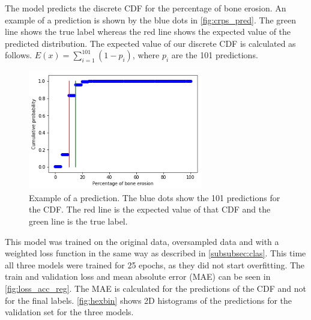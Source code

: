 \documentclass[12pt]{article}
\begin{document}
The model predicts the discrete CDF for the percentage of bone erosion. An example of a prediction is shown by the blue dots in \autoref{fig:crps_pred}. The green line shows the true label whereas the red line shows the expected value of the predicted distribution. The expected value of our discrete CDF is calculated as follows. $E(x) = \sum_{i=1}^{101} \left ( 1 - p_i \right )$, where $p_i$ are the 101 predictions.

\begin{figure}[ht]
\includegraphics[width=3in]{crps_pred}	
\caption{Example of a prediction. The blue dots show the 101 predictions for the CDF. The red line is the expected value of that CDF and the green line is the true label.}
\label{fig:crps_pred}
\end{figure}

This model was trained on the original data, oversampled data and with a weighted loss function in the same way as described in \autoref{subsubsec:clas}. This time all three models were trained for 25 epochs, as they did not start overfitting. The train and validation loss and mean absolute error (MAE) can be seen in \autoref{fig:loss_acc_reg}. The MAE is calculated for the predictions of the CDF and not for the final labels. \autoref{fig:hexbin} shows 2D histograms of the predictions for the validation set for the three models. 
\end{document}
